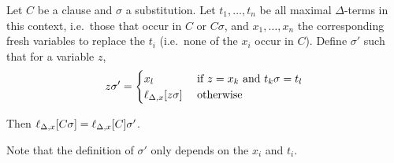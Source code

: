 \documentclass[,%
	paper=a4,%
	DIV14, 
	liststotoc,
	bibtotoc,
	draft=false,%
	numbers=noendperiod
]{scrartcl}
\newcommand{\lif}[1]{\lift{\Delta}{#1}{x}}
\begin{document}
\begin{lemma}
	\label{lemma:lif}

	Let $C$ be a clause and $\sigma$ a substitution.
	Let $t_1,\ldots,t_n$ be all maximal $\Delta$-terms in this context, i.e.\ those that occur in $C$ or $C\sigma$,  and 
	$x_1, \ldots, x_n$ the corresponding fresh variables to replace the $t_i$ (i.e.~none of the $x_i$ occur in $C$).
	Define $\sigma'$ such that for a variable $z$, 
	\[
		z \sigma' =
		\begin{cases} 
			x_l & \text{ if } z = x_k \text{ and } t_k\sigma = t_l  \\
			\lif{z\sigma} & \text{ otherwise}
		\end{cases} 
	\]

	Then
	$\lif{C\sigma} =
	\lif{C}\sigma'$.
\end{lemma}
Note that the definition of $\sigma'$ only depends on the $x_i$ and $t_i$.
\end{document}
